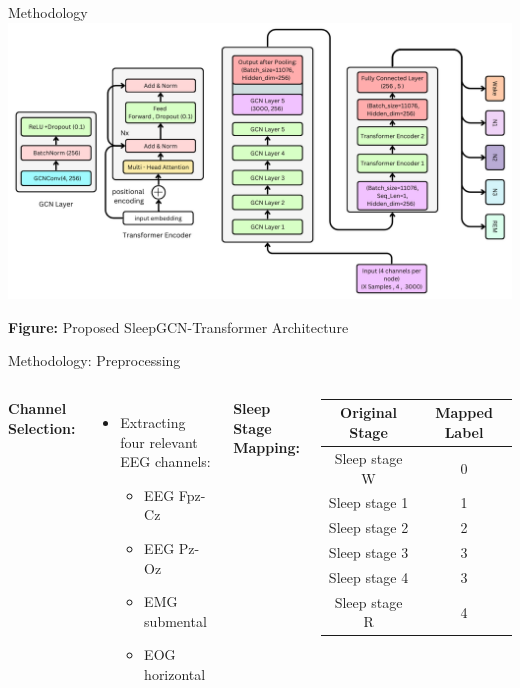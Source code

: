 \begin{frame}{Methodology}
    \centering
    \includegraphics[width=0.85\linewidth]{figures/Architechture.png} %

        \small \textbf{Figure:} Proposed SleepGCN-Transformer Architecture %
\end{frame}

\begin{frame}{Methodology: Preprocessing}
    \begin{columns}
        \textbf{Channel Selection:}
        \begin{itemize}
            \item Extracting four relevant EEG channels:
            \begin{itemize}
                \item EEG Fpz-Cz
                \item EEG Pz-Oz
                \item EMG submental
                \item EOG horizontal
            \end{itemize}
        \end{itemize}

        \textbf{Sleep Stage Mapping:}
        \begin{table}[]
            \centering
            \renewcommand{\arraystretch}{1.2}
            \begin{tabular}{|c|c|}
                \hline
                \textbf{Original Stage} & \textbf{Mapped Label} \\
                \hline
                Sleep stage W  & 0 \\
                Sleep stage 1  & 1 \\
                Sleep stage 2  & 2 \\
                Sleep stage 3  & 3 \\
                Sleep stage 4  & 3 \\
                Sleep stage R  & 4 \\
                \hline
            \end{tabular}
        \end{table}
    \end{columns}
\end{frame}









